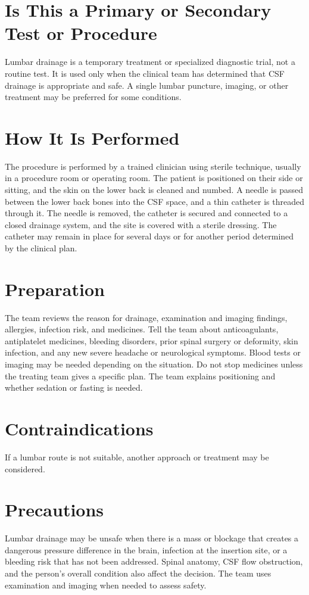 \section*{Is This a Primary or Secondary Test or Procedure}
Lumbar drainage is a temporary treatment or specialized diagnostic trial, not a routine test. It is used only when the clinical team has determined that CSF drainage is appropriate and safe. A single lumbar puncture, imaging, or other treatment may be preferred for some conditions.

\section*{How It Is Performed}
The procedure is performed by a trained clinician using sterile technique, usually in a procedure room or operating room. The patient is positioned on their side or sitting, and the skin on the lower back is cleaned and numbed. A needle is passed between the lower back bones into the CSF space, and a thin catheter is threaded through it. The needle is removed, the catheter is secured and connected to a closed drainage system, and the site is covered with a sterile dressing. The catheter may remain in place for several days or for another period determined by the clinical plan.

\section*{Preparation}
The team reviews the reason for drainage, examination and imaging findings, allergies, infection risk, and medicines. Tell the team about anticoagulants, antiplatelet medicines, bleeding disorders, prior spinal surgery or deformity, skin infection, and any new severe headache or neurological symptoms. Blood tests or imaging may be needed depending on the situation. Do not stop medicines unless the treating team gives a specific plan. The team explains positioning and whether sedation or fasting is needed.

\section*{Contraindications}
If a lumbar route is not suitable, another approach or treatment may be considered.

\section*{Precautions}
Lumbar drainage may be unsafe when there is a mass or blockage that creates a dangerous pressure difference in the brain, infection at the insertion site, or a bleeding risk that has not been addressed. Spinal anatomy, CSF flow obstruction, and the person's overall condition also affect the decision. The team uses examination and imaging when needed to assess safety.

